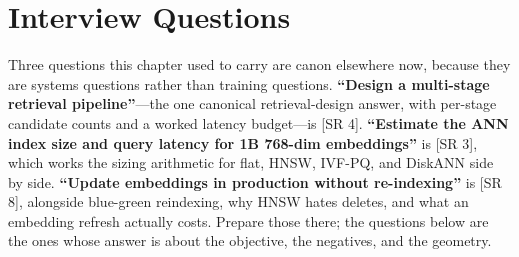 \section{Interview Questions}
\label{sec:similarity_questions}

\begin{keyinsight}
Three questions this chapter used to carry are canon elsewhere now, because they are systems questions rather than training questions. \textbf{``Design a multi-stage retrieval pipeline''}---the one canonical retrieval-design answer, with per-stage candidate counts and a worked latency budget---is [SR 4]. \textbf{``Estimate the ANN index size and query latency for 1B 768-dim embeddings''} is [SR 3], which works the sizing arithmetic for flat, HNSW, IVF-PQ, and DiskANN side by side. \textbf{``Update embeddings in production without re-indexing''} is [SR 8], alongside blue-green reindexing, why HNSW hates deletes, and what an embedding refresh actually costs. Prepare those there; the questions below are the ones whose answer is about the objective, the negatives, and the geometry.
\end{keyinsight}


